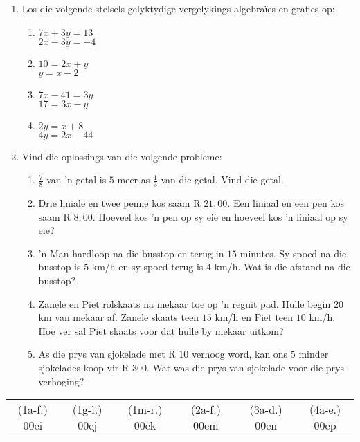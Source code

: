 \begin{eocexercises}{}
\begin{enumerate}[itemsep=5pt, label=\textbf{\arabic*}. ]
\item Los die volgende stelsels gelyktydige vergelykings algebra\"ies en grafies op:

\begin{enumerate}[itemsep=5pt,label=\textbf{(\alph*)}]
\item $7x+3y=13$\\$2x-3y=-4$  
\item $10=2x+y$\\$y=x-2$
\item $7x-41=3y$\\$17=3x-y$
\item $2y=x+8$\\$4y=2x-44$
\end{enumerate}

\item Vind die oplossings van die volgende probleme:

\begin{enumerate}[itemsep=5pt,label=\textbf{(\alph*)}]
\item $\frac{7}{8}$ van ’n getal is $5$ meer as $\frac{1}{3}$ van die getal. Vind die getal.

\item Drie liniale en twee penne kos saam R $21,00$. Een liniaal en een pen kos saam R
$8,00$. Hoeveel kos ’n pen op sy eie en hoeveel kos ’n liniaal op sy eie?

\item ’n Man hardloop na die busstop en terug in $15$ minutes. Sy spoed na die busstop is
$5$ km/h en sy spoed terug is $4$ km/h. Wat is die afstand na die busstop?
\item Zanele en Piet rolskaats na mekaar toe op ’n reguit pad. Hulle begin $20$ km van
mekaar af. Zanele skaats teen $15$ km/h en Piet teen $10$ km/h. Hoe ver sal Piet skaats
voor dat hulle by mekaar uitkom?

\item As die prys van sjokelade met R $10$ verhoog word, kan ons $5$ minder sjokelades
koop vir R $300$. Wat was die prys van sjokelade voor die prys-verhoging?

   

\end{enumerate}
\end{enumerate}
\practiceinfo
\par 
\par \begin{tabular}[h]{cccccc} 
(1a-f.) 00ei&  (1g-l.) 00ej& (1m-r.) 00ek&  (2a-f.) 00em&  (3a-d.) 00en&  (4a-e.) 00ep\end{tabular}

\end{eocexercises}